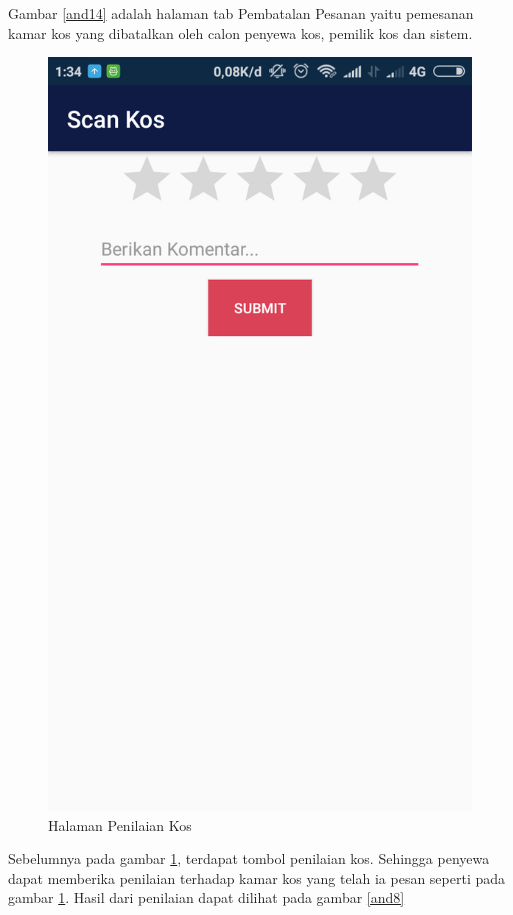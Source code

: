 		Gambar \ref{and14} adalah halaman tab Pembatalan Pesanan yaitu pemesanan kamar kos yang dibatalkan oleh calon penyewa kos, pemilik kos dan sistem.
		
		\begin{figure}[H]
			\centering
			\includegraphics[scale=0.25]{gambar/and/19}
			\caption{Halaman Penilaian Kos}
			\label{and15}
		\end{figure}
	
		Sebelumnya pada gambar \ref{and15}, terdapat tombol penilaian kos. Sehingga penyewa dapat memberika penilaian terhadap kamar kos yang telah ia pesan seperti pada gambar \ref{and15}. Hasil dari penilaian dapat dilihat pada gambar \ref{and8}
	
